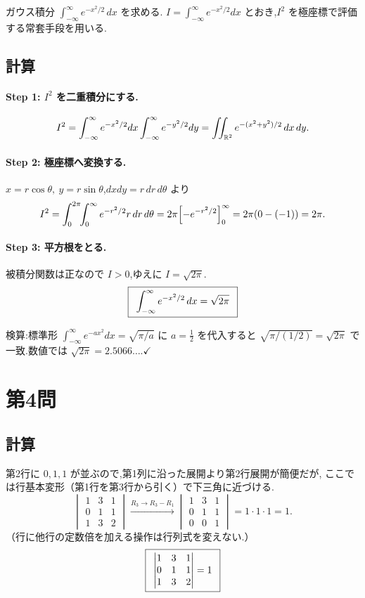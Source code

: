 \documentclass[11pt,a4paper]{article}
\begin{document}
ガウス積分 $\displaystyle\int_{-\infty}^{\infty}e^{-x^2/2}\,dx$ を求める.
$I=\int_{-\infty}^{\infty}e^{-x^2/2}dx$ とおき,$I^2$ を極座標で評価する常套手段を用いる.

\subsection*{計算}

\paragraph{Step 1: $I^2$ を二重積分にする.}
\[
I^2=\int_{-\infty}^{\infty}e^{-x^2/2}dx\int_{-\infty}^{\infty}e^{-y^2/2}dy
=\iint_{\mathbb{R}^2}e^{-(x^2+y^2)/2}\,dx\,dy.
\]

\paragraph{Step 2: 極座標へ変換する.}
$x=r\cos\theta,\ y=r\sin\theta$,$dxdy=r\,dr\,d\theta$ より
\[
I^2=\int_0^{2\pi}\!\!\int_0^{\infty}e^{-r^2/2}r\,dr\,d\theta
=2\pi\Bigl[-e^{-r^2/2}\Bigr]_0^{\infty}=2\pi(0-(-1))=2\pi.
\]

\paragraph{Step 3: 平方根をとる.}
被積分関数は正なので $I>0$,ゆえに $I=\sqrt{2\pi}$.
\[
\ans{\
\displaystyle\int_{-\infty}^{\infty}e^{-x^2/2}\,dx=\sqrt{2\pi}\ }
\]

検算:標準形 $\int_{-\infty}^\infty e^{-ax^2}dx=\sqrt{\pi/a}$ に $a=\tfrac12$ を代入すると
$\sqrt{\pi/(1/2)}=\sqrt{2\pi}$ で一致.数値では $\sqrt{2\pi}=2.5066\ldots$.$\checkmark$

\section*{第4問}

\subsection*{計算}

第2行に $0,1,1$ が並ぶので,第1列に沿った展開より第2行展開が簡便だが,
ここでは行基本変形（第1行を第3行から引く）で下三角に近づける.
\[
\begin{vmatrix}1&3&1\\0&1&1\\1&3&2\end{vmatrix}
\xrightarrow{R_3\to R_3-R_1}
\begin{vmatrix}1&3&1\\0&1&1\\0&0&1\end{vmatrix}
=1\cdot1\cdot1=1.
\]
（行に他行の定数倍を加える操作は行列式を変えない.）
\[
\ans{\
\begin{vmatrix}1&3&1\\0&1&1\\1&3&2\end{vmatrix}=1\ }
\]
\end{document}
